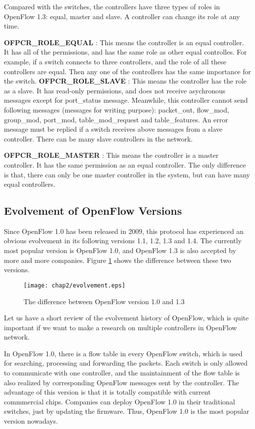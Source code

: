 Compared with the switches, the controllers have three types of roles in OpenFlow 1.3: equal, master and slave. A controller can change its role at any time.

\textbf{OFPCR\_ROLE\_EQUAL} : This means the controller is an equal controller. It has all of the permissions, and has the same role as other equal controlles. For example, if a switch connects to three controllers, and the role of all these controllers are equal. Then any one of the controllers has the same importance for the switch.
\textbf{OFPCR\_ROLE\_SLAVE} : This means the controller has the role as a slave. It has read-only permissions, and does not receive asychronous messages except for port\_status message. Meanwhile, this controller cannot send following messages (messages for writing purpose): packet\_out, flow\_mod, group\_mod, port\_mod, table\_mod\_request and table\_features. An error message must be replied if a switch receives above messages from a slave controller. There can be many slave controllers in the network.

\textbf{OFPCR\_ROLE\_MASTER} : This means the controller is a master controller. It has the same permission as an equal controller. The only difference is that, there can only be one master controller in the system, but can have many equal controllers.

\subsection{Evolvement of OpenFlow Versions}
\label{sec:Evolvement of OpenFlow Versions}

Since OpenFlow 1.0 has been released in 2009, this protocol has experienced an obvious evolvement in its following versions 1.1, 1.2, 1.3 and 1.4. The currently most popular version is OpenFlow 1.0, and OpenFlow 1.3 is also accepted by more and more companies. Figure \ref{evolvement} shows the difference between these two versions.

\begin{figure}[htbp]
  \centering
  \texttt{[image: chap2/evolvement.eps]}
  \caption{The difference between OpenFlow version 1.0 and 1.3}\label{evolvement}
\end{figure}

Let us have a short review of the evolvement history of OpenFlow, which is quite important if we want to make a research on multiple controllers in OpenFlow network.

In OpenFlow 1.0, there is a flow table in every OpenFlow switch, which is used for searching, processing and forwarding the packets. Each switch is only allowed to communicate with one controller, and the maintainment of the flow table is also realized by corresponding OpenFlow messages sent by the controller. The advantage of this version is that it is totally compatible with current commmercial chips. Companies can deploy OpenFlow 1.0 in their traditional switches, just by updating the firmware. Thus, OpenFlow 1.0 is the most popular version nowadays.

